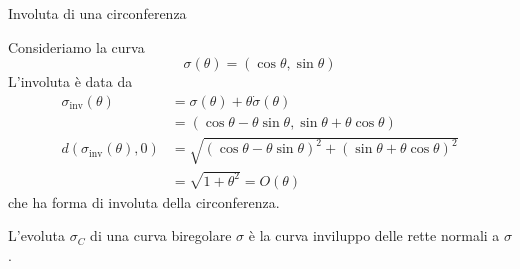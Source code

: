 \documentclass[a4paper]{article}
\begin{document}
\begin{snippetexample}{Involuta di una circonferenza}
    \begin{figure}
        \begin{center}
        \end{center}
        \vspace{-2.5cm}
    \end{figure}
    Consideriamo la curva
    \[
        \sigma(\theta) = (\cos\theta, \sin\theta)
    \]
    L'involuta è data da
    \begin{align*}
        \sigma_{\text{inv}}(\theta) &= \sigma(\theta) + \theta \dot\sigma(\theta) \\
        &= (\cos\theta - \theta\sin\theta, \sin\theta + \theta\cos\theta) \\
    d(\sigma_{\text{inv}}(\theta), 0) &= \sqrt{
            {(\cos\theta - \theta\sin\theta)}^2 + {(\sin\theta + \theta\cos\theta)}^2
        } \\
        &= \sqrt{1 + \theta^2} = O(\theta) %
    \end{align*}
    che ha forma di involuta della circonferenza.
    \wrapfill
\end{snippetexample}

\begin{snippetcorollary}{}
    L'evoluta \(\sigma_C\) di una curva biregolare \(\sigma\)
    è la curva inviluppo delle rette normali a \(\sigma\).
\end{snippetcorollary}
\end{document}
